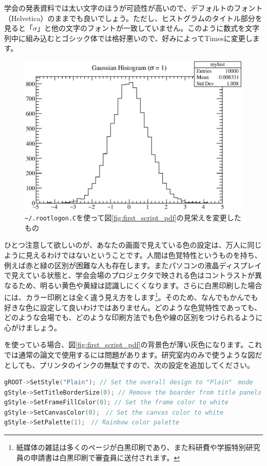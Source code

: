 学会の発表資料では太い文字のほうが可読性が高いので、デフォルトのフォント（Helvetica）のままでも良いでしょう。ただし、ヒストグラムのタイトル部分を見ると「$\sigma$」と他の文字のフォントが一致していません。このように数式を文字列中に組み込むとゴシック体では格好悪いので、好みによってTimesに変更します。

\begin{NoFloat}

\end{NoFloat}
\pagebreak

\begin{figure}
  \centering
  \includegraphics[width=12cm,clip]{fig/first_script_mod.eps}
  \caption{\texttt{\~{}/.rootlogon.C}を使って図\ref{fig:first_script_pdf}の見栄えを変更したもの}
  \label{fig:first_script_mod_eps}
\end{figure}

ひとつ注意して欲しいのが、あなたの画面で見えている色の設定は、万人に同じように見えるわけではないということです。人間は色覚特性というものを持ち、例えば赤と緑の区別が困難な人も存在します。またパソコンの液晶ディスプレイで見えている状態と、学会会場のプロジェクタで映される色はコントラストが異なるため、明るい黄色や黄緑は認識しにくくなります。さらに白黒印刷した場合には、カラー印刷とは全く違う見え方をします\footnote{紙媒体の雑誌は多くのページが白黒印刷であり、また科研費や学振特別研究員の申請書は白黒印刷で審査員に送付されます。}。そのため、なんでもかんでも好きな色に設定して良いわけではありません。どのような色覚特性であっても、どのような会場でも、どのような印刷方法でも色や線の区別をつけられるように心がけましょう。

を使っている場合、図\ref{fig:first_script_pdf}の背景色が薄い灰色になります。これでは通常の論文で使用するには問題があります。研究室内のみで使うような図だとしても、プリンタのインクの無駄ですので、次の設定を追加してください。

\begin{lstlisting}[language=c++]
gROOT->SetStyle("Plain"); // Set the overall design to "Plain"　mode
gStyle->SetTitleBorderSize(0); // Remove the boarder from title panels
gStyle->SetFrameFillColor(0); // Set the frame color to white
gStyle->SetCanvasColor(0);　// Set the canvas color to white
gStyle->SetPalette(1);　// Rainbow color palette
\end{lstlisting}

